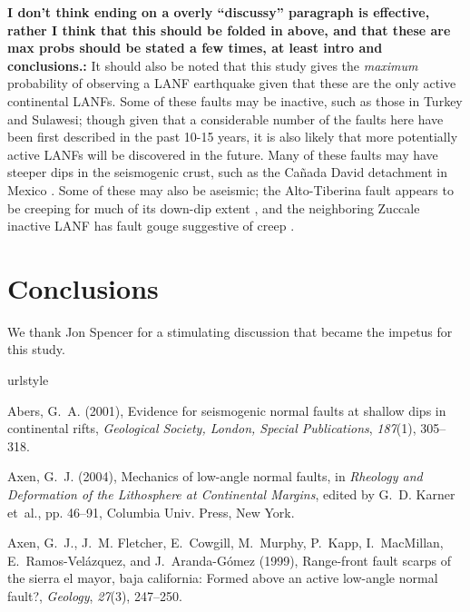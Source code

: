 \documentclass[twocolumn,grl]{AGUTeX}
\begin{document}
\begin{article}
{\bf I don't think ending on a overly ``discussy'' paragraph is
  effective, rather I think that this should be folded in above, and
  that these are max probs should be stated a few times, at least
  intro and conclusions.:} It should also be noted that this study
gives the \emph{maximum} probability of observing a LANF earthquake
given that these are the only active continental LANFs.  Some of these
faults may be inactive, such as those in Turkey and Sulawesi; though
given that a considerable number of the faults here have been first
described in the past 10-15 years, it is also likely that more
potentially active LANFs will be discovered in the future.  Many of
these faults may have steeper dips in the seismogenic crust, such as
the Ca\~nada David detachment in Mexico \citep{fletcherspelz2009}.
Some of these may also be aseismic; the Alto-Tiberina fault appears to
be creeping for much of its down-dip extent
\citep{hreinsdottir2009altotib}, and the neighboring Zuccale inactive
LANF has fault gouge suggestive of creep
\citep{collettiniholdsworth2004}.

\section{Conclusions}

\begin{acknowledgements}
  We thank Jon Spencer for a stimulating discussion that became the
  impetus for this study.
\end{acknowledgements}

\begin{thebibliography}{25}
\providecommand{\natexlab}[1]{#1}
\expandafter\ifx\csname urlstyle\endcsname\relax
  \providecommand{\doi}[1]{doi:\discretionary{}{}{}#1}\else
  \providecommand{\doi}{doi:\discretionary{}{}{}\begingroup
  \urlstyle{rm}\Url}\fi

Abers, G.~A. (2001), Evidence for seismogenic normal faults at shallow dips in
  continental rifts, \textit{Geological Society, London, Special Publications},
  \textit{187}(1), 305--318.

Axen, G.~J. (2004), Mechanics of low-angle normal faults, in \textit{Rheology
  and Deformation of the Lithosphere at Continental Margins}, edited by G.~D.
  Karner et~al., pp. 46--91, Columbia Univ. Press, New York.

Axen, G.~J., J.~M. Fletcher, E.~Cowgill, M.~Murphy, P.~Kapp, I.~MacMillan,
  E.~Ramos-Vel{\'a}zquez, and J.~Aranda-G{\'o}mez (1999), Range-front fault
  scarps of the sierra el mayor, baja california: Formed above an active
  low-angle normal fault?, \textit{Geology}, \textit{27}(3), 247--250.


\end{thebibliography}
\end{article}
\end{document}
